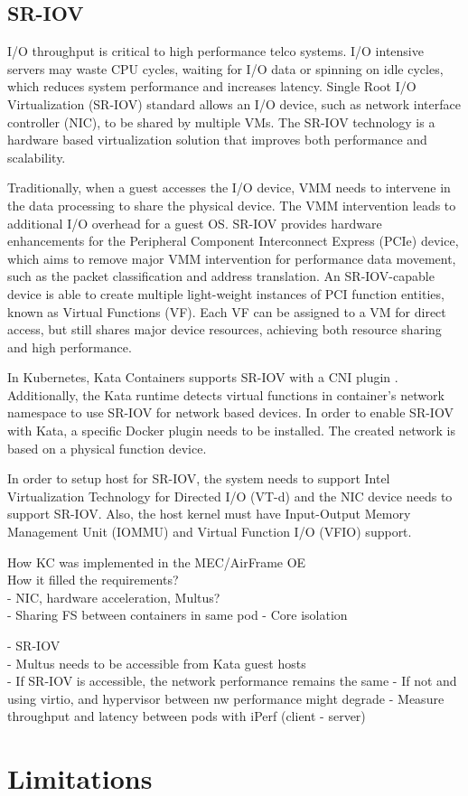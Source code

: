 \subsection{SR-IOV}
\label{section:SR-IOV}

I/O throughput is critical to high performance telco systems. I/O intensive servers may waste CPU cycles, waiting for I/O data or spinning on idle cycles, which reduces system performance and increases latency. Single Root I/O Virtualization (SR-IOV) standard allows an I/O device, such as network interface controller (NIC), to be shared by multiple VMs. The SR-IOV technology is a hardware based virtualization solution that improves both performance and scalability. \cite{Dong2012}

Traditionally, when a guest accesses the I/O device, VMM needs to intervene in the data processing to share the physical device. The VMM intervention leads to additional I/O overhead for a guest OS. SR-IOV provides hardware enhancements for the Peripheral Component Interconnect Express (PCIe) device, which aims to remove major VMM intervention for performance data movement, such as the packet classification and address translation. An SR-IOV-capable device is able to create multiple light-weight instances of PCI function entities, known as Virtual Functions (VF). Each VF can be assigned to a VM for direct access, but still shares major device resources, achieving both resource sharing and high performance. \cite{Dong2012}

In Kubernetes, Kata Containers supports SR-IOV with a CNI plugin \cite{SR-IOVOpenShift}. Additionally, the Kata runtime detects virtual functions in container's network namespace to use SR-IOV for network based devices. In order to enable SR-IOV with Kata, a specific Docker plugin needs to be installed. The created network is based on a physical function device. \cite{SR-IOVKataContainers}

In order to setup host for SR-IOV, the system needs to support Intel Virtualization Technology for Directed I/O (VT-d) and the NIC device needs to support SR-IOV. Also, the host kernel must have Input-Output Memory Management Unit (IOMMU) and Virtual Function I/O (VFIO) support.




How KC was implemented in the MEC/AirFrame OE \\
How it filled the requirements? \\
- NIC, hardware acceleration, Multus? \\
- Sharing FS between containers in same pod
- Core isolation

- SR-IOV \\
	- Multus needs to be accessible from Kata guest hosts \\
	
- If SR-IOV is accessible, the network performance remains the same
	- If not and using virtio, and hypervisor between nw performance might degrade
		- Measure throughput and latency between pods with iPerf (client - server)

\section{Limitations}
